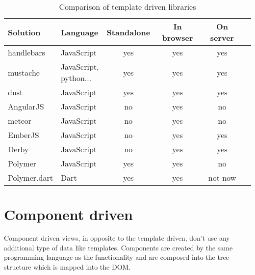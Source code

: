 \documentclass[oneside, 12pt]{book}
\begin{document}
  \begin{table}
    \begin{tabular}{|l|l|c|c|c|c|}
      \hline
      \textbf{Solution}& \textbf{Language}   & \textbf{Standalone} & \textbf{In browser} & \textbf{On server} \\
      \hline
      handlebars       & JavaScript          &         yes         &        yes          &        yes         \\
      \hline
      {{mustache}}     & \shortstack{JavaScript,  
                            \\    python...} &        yes         &        yes          &        yes          \\
      \hline
      dust             & JavaScript          &         yes         &        yes          &        yes         \\
      \hline
      AngularJS        & JavaScript          &         no          &        yes          &        no          \\
      \hline
      meteor           & JavaScript          &         no          &        yes          &        no          \\
      \hline
      EmberJS          & JavaScript          &         no          &        yes          &        yes         \\
      \hline
      Derby            & JavaScript          &         no          &        yes          &        yes         \\
      \hline
      Polymer          & JavaScript          &         yes         &        yes          &        no          \\
      \hline
      Polymer.dart     & Dart                &         yes         &        yes          &      not now       \\
      \hline
    \end{tabular}
    \caption{Comparison of template driven libraries}
    \label{table:template-driven-libraries}
  \end{table}

\section{Component driven}\label{sec:existing-component}

  Component driven views, in opposite to the template driven, don't use any additional type of data like templates. 
  Components are created by the same programming language as the functionality and 
  are composed into the tree structure which is mapped into the DOM. 
\end{document}
